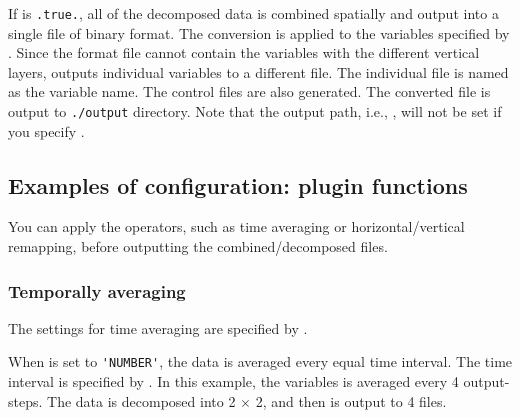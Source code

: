 If  is \verb|.true.|, all of the decomposed data is combined spatially and output into a single file of \grads binary format.
The conversion is applied to the variables specified by .
Since the \grads format file cannot contain the variables with the different vertical layers, \sno outputs individual variables to a different file.
The individual file is named as the variable name.
The control files are also generated.
The converted file is output to \verb|./output| directory.
Note that the output path, i.e., , will not be set if you specify .




\subsection{Examples of configuration: plugin functions}

You can apply the operators, such as time averaging or horizontal/vertical remapping, before outputting the combined/decomposed files.

\subsubsection{Temporally averaging}

The settings for time averaging are specified by .
%

When  is set to \verb|'NUMBER'|, the data is averaged every equal time interval.
The time interval is specified by .
In this example, the variables is averaged every 4 output-steps.
The data is decomposed into 2 $\times$ 2, and then is output to 4 files.


